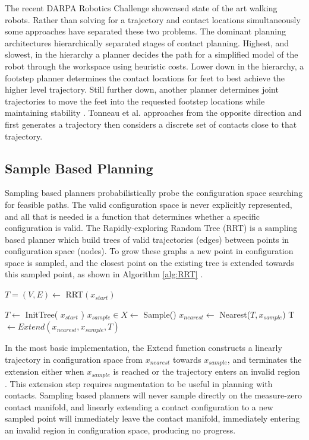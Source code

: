 \documentclass[../thesis.tex]{subfiles}
\begin{document}
The recent DARPA Robotics Challenge showcased state of the art walking robots.
Rather than solving for a trajectory and contact locations simultaneously some approaches have separated these two problems.
The dominant planning architectures hierarchically separated stages of contact planning.
Highest, and slowest, in the hierarchy a planner decides the path for a simplified model of the robot through the workspace using heuristic costs.
Lower down in the hierarchy, a footstep planner determines the contact locations for feet to best achieve the higher level trajectory.
Still further down, another planner determines joint trajectories to move the feet into the requested footstep locations while maintaining stability  \cite{Deits2015} \cite{Atkeson2015}.
Tonneau et al. \cite{Tonneau} approaches from the opposite direction and first generates a trajectory then considers a discrete set of contacts close to that trajectory.



\subsection{Sample Based Planning} \label{sec:related:RRT}
Sampling based planners probabilistically probe the configuration space searching for feasible paths.
The valid configuration space is never explicitly represented, and all that is needed is a function that determines whether a specific configuration is valid.
The Rapidly-exploring Random Tree (RRT) is a sampling based planner which build trees of valid trajectories (edges) between points in configuration space (nodes).
To grow these graphs a new point in configuration space is sampled, and the closest point on the existing tree is extended towards this sampled point, as shown in Algorithm \ref{alg:RRT} \cite{LaValle1998}.

\begin{algorithm}
  \caption{$T=(V,E) \leftarrow$ RRT$(x_{start})$} \label{alg:RRT}
  \begin{algorithmic}[1]
    \State $T \leftarrow$ InitTree( $x_{start}$ )
    \State $x_{sample} \in X \leftarrow$ Sample()
    \State $x_{nearest} \leftarrow $ Nearest($T, x_{sample}$)
    \State T $\leftarrow Extend(x_{nearest}, x_{sample}, T)$
    \EndWhile
  \end{algorithmic}
\end{algorithm}

In the most basic implementation, the Extend function constructs a linearly trajectory in configuration space from $x_{nearest}$ towards $x_{sample}$, and terminates the extension either when $x_{sample}$ is reached or the trajectory enters an invalid region \cite{LaValle1998}.
This extension step requires augmentation to be useful in planning with contacts.
Sampling based planners will never sample directly on the measure-zero contact manifold, and linearly extending a contact configuration to a new sampled point will immediately leave the contact manifold, immediately entering an invalid region in configuration space, producing no progress.
\end{document}
